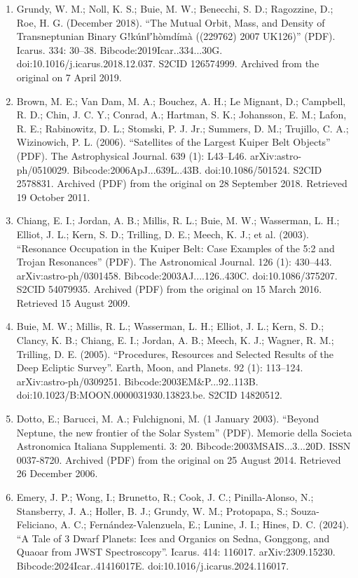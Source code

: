 \begin{enumerate}
\item Grundy, W. M.; Noll, K. S.; Buie, M. W.; Benecchi, S. D.; Ragozzine, D.; Roe, H. G. (December 2018). ``The Mutual Orbit, Mass, and Density of Transneptunian Binary Gǃkúnǁʼhòmdímà ((229762) 2007 UK126)'' (PDF). Icarus. 334: 30–38. Bibcode:2019Icar..334...30G. doi:10.1016/j.icarus.2018.12.037. S2CID 126574999. Archived from the original on 7 April 2019.
\item Brown, M. E.; Van Dam, M. A.; Bouchez, A. H.; Le Mignant, D.; Campbell, R. D.; Chin, J. C. Y.; Conrad, A.; Hartman, S. K.; Johansson, E. M.; Lafon, R. E.; Rabinowitz, D. L.; Stomski, P. J. Jr.; Summers, D. M.; Trujillo, C. A.; Wizinowich, P. L. (2006). ``Satellites of the Largest Kuiper Belt Objects'' (PDF). The Astrophysical Journal. 639 (1): L43–L46. arXiv:astro-ph/0510029. Bibcode:2006ApJ...639L..43B. doi:10.1086/501524. S2CID 2578831. Archived (PDF) from the original on 28 September 2018. Retrieved 19 October 2011.
\item Chiang, E. I.; Jordan, A. B.; Millis, R. L.; Buie, M. W.; Wasserman, L. H.; Elliot, J. L.; Kern, S. D.; Trilling, D. E.; Meech, K. J.; et al. (2003). ``Resonance Occupation in the Kuiper Belt: Case Examples of the 5:2 and Trojan Resonances'' (PDF). The Astronomical Journal. 126 (1): 430–443. arXiv:astro-ph/0301458. Bibcode:2003AJ....126..430C. doi:10.1086/375207. S2CID 54079935. Archived (PDF) from the original on 15 March 2016. Retrieved 15 August 2009.
\item Buie, M. W.; Millis, R. L.; Wasserman, L. H.; Elliot, J. L.; Kern, S. D.; Clancy, K. B.; Chiang, E. I.; Jordan, A. B.; Meech, K. J.; Wagner, R. M.; Trilling, D. E. (2005). ``Procedures, Resources and Selected Results of the Deep Ecliptic Survey''. Earth, Moon, and Planets. 92 (1): 113–124. arXiv:astro-ph/0309251. Bibcode:2003EM\&P...92..113B. doi:10.1023/B:MOON.0000031930.13823.be. S2CID 14820512.
\item Dotto, E.; Barucci, M. A.; Fulchignoni, M. (1 January 2003). ``Beyond Neptune, the new frontier of the Solar System'' (PDF). Memorie della Societa Astronomica Italiana Supplementi. 3: 20. Bibcode:2003MSAIS...3...20D. ISSN 0037-8720. Archived (PDF) from the original on 25 August 2014. Retrieved 26 December 2006.
\item Emery, J. P.; Wong, I.; Brunetto, R.; Cook, J. C.; Pinilla-Alonso, N.; Stansberry, J. A.; Holler, B. J.; Grundy, W. M.; Protopapa, S.; Souza-Feliciano, A. C.; Fernández-Valenzuela, E.; Lunine, J. I.; Hines, D. C. (2024). ``A Tale of 3 Dwarf Planets: Ices and Organics on Sedna, Gonggong, and Quaoar from JWST Spectroscopy''. Icarus. 414: 116017. arXiv:2309.15230. Bibcode:2024Icar..41416017E. doi:10.1016/j.icarus.2024.116017.

\end{enumerate}
